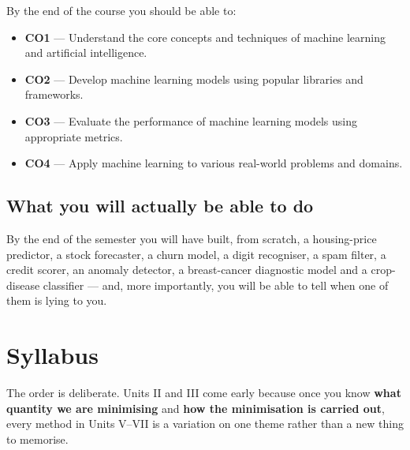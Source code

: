\documentclass[11pt]{article}
\begin{document}
By the end of the course you should be able to:

\begin{itemize}[leftmargin=*]
  \item \textbf{CO1} --- Understand the core concepts and techniques of machine
    learning and artificial intelligence.
  \item \textbf{CO2} --- Develop machine learning models using popular libraries
    and frameworks.
  \item \textbf{CO3} --- Evaluate the performance of machine learning models
    using appropriate metrics.
  \item \textbf{CO4} --- Apply machine learning to various real-world problems
    and domains.
\end{itemize}

\subsection{What you will actually be able to do}

By the end of the semester you will have built, from scratch, a housing-price
predictor, a stock forecaster, a churn model, a digit recogniser, a spam filter,
a credit scorer, an anomaly detector, a breast-cancer diagnostic model and a
crop-disease classifier --- and, more importantly, you will be able to tell when
one of them is lying to you.

\newpage
\section{Syllabus}

The order is deliberate. Units II and III come early because once you know
\textbf{what quantity we are minimising} and \textbf{how the minimisation is
carried out}, every method in Units V--VII is a variation on one theme rather
than a new thing to memorise.
\end{document}
